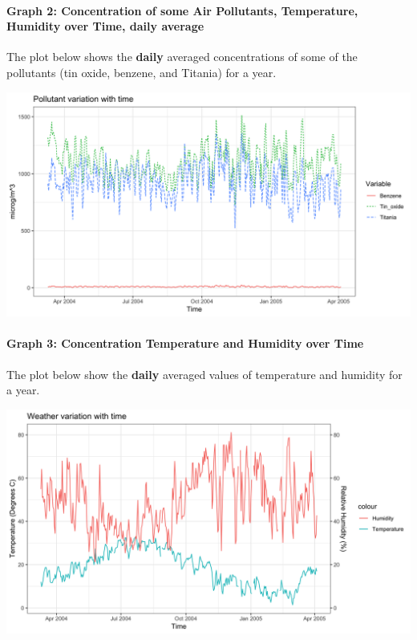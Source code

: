\documentclass[]{article}
\let\oldparagraph\paragraph
\renewcommand{\paragraph}[1]{\oldparagraph{#1}\mbox{}}
\begin{document}
\hypertarget{graph-2-concentration-of-some-air-pollutants-temperature-humidity-over-time-daily-average}{%
\paragraph{Graph 2: Concentration of some Air Pollutants, Temperature,
Humidity over Time, daily
average}\label{graph-2-concentration-of-some-air-pollutants-temperature-humidity-over-time-daily-average}}

The plot below shows the \textbf{daily} averaged concentrations of some
of the pollutants (tin oxide, benzene, and Titania) for a year.

\includegraphics{../Images/pollutantsvstime.png}

\hypertarget{graph-3-concentration-temperature-and-humidity-over-time}{%
\paragraph{Graph 3: Concentration Temperature and Humidity over
Time}\label{graph-3-concentration-temperature-and-humidity-over-time}}

The plot below show the \textbf{daily} averaged values of temperature
and humidity for a year.

\includegraphics{../Images/weathervstime.png}
\end{document}
